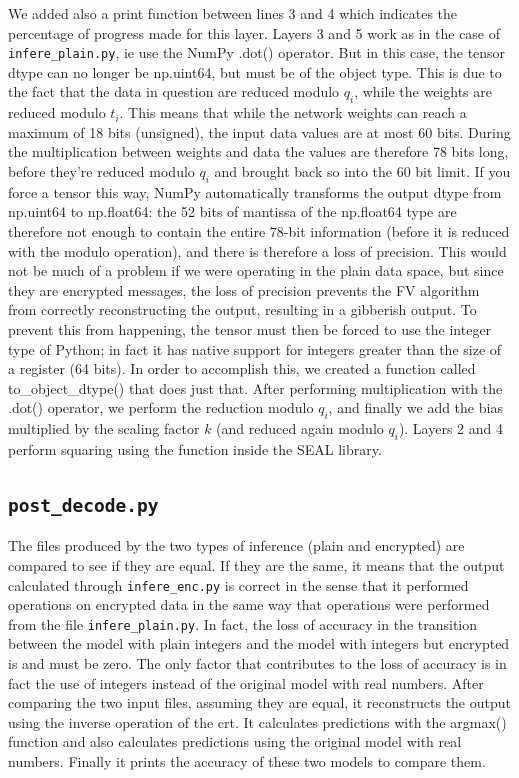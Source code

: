 We added also a print function between lines 3 and 4 which indicates the percentage of progress made for this layer. Layers 3 and 5 work as in the case of \texttt{infere_plain.py}, ie use the NumPy .dot() operator. But in this case, the tensor dtype can no longer be np.uint64, but must be of the object type. This is due to the fact that the data in question are reduced modulo $q_i$, while the weights are reduced modulo $t_i$. This means that while the network weights can reach a maximum of 18 bits (unsigned), the input data values are at most 60 bits. During the multiplication between weights and data the values are therefore 78 bits long, before they're reduced modulo $q_i$ and brought back so into the 60 bit limit. If you force a tensor this way, NumPy automatically transforms the output dtype from np.uint64 to np.float64: the 52 bits of mantissa of the np.float64 type are therefore not enough to contain the entire 78-bit information (before it is reduced with the modulo operation), and there is therefore a loss of precision. This would not be much of a problem if we were operating in the plain data space, but since they are encrypted messages, the loss of precision prevents the FV algorithm from correctly reconstructing the output, resulting in a gibberish output. To prevent this from happening, the tensor must then be forced to use the integer type of Python; in fact it has native support for integers greater than the size of a register (64 bits). In order to accomplish this, we created a function called to_object_dtype() that does just that. After performing multiplication with the .dot() operator, we perform the reduction modulo $q_i$, and finally we add the bias multiplied by the scaling factor $k$ (and reduced again modulo $q_i$). Layers 2 and 4 perform squaring using the function inside the SEAL library.

\subsection{\texttt{post_decode.py}}

The files produced by the two types of inference (plain and encrypted) are compared to see if they are equal. If they are the same, it means that the output calculated through \texttt{infere_enc.py} is correct in the sense that it performed operations on encrypted data in the same way that operations were performed from the file \texttt{infere_plain.py}. In fact, the loss of accuracy in the transition between the model with plain integers and the model with integers but encrypted is and must be zero. The only factor that contributes to the loss of accuracy is in fact the use of integers instead of the original model with real numbers. After comparing the two input files, assuming they are equal, it reconstructs the output using the inverse operation of the crt. It calculates predictions with the argmax() function and also calculates predictions using the original model with real numbers. Finally it prints the accuracy of these two models to compare them.
